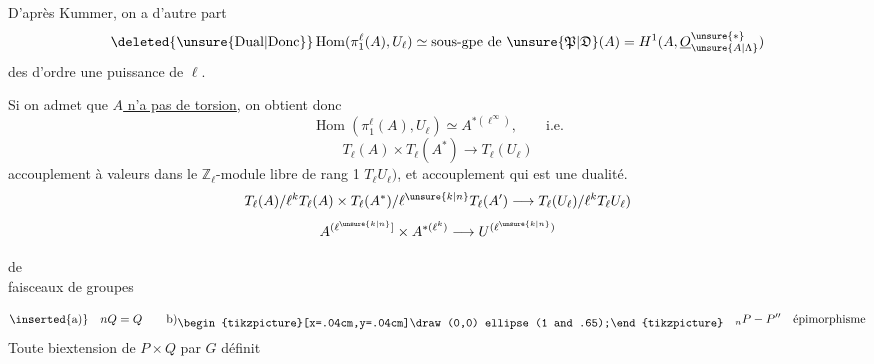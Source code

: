 D'après Kummer, on a d'autre part
\[
\deleted{\text{\unsure{Dual|Donc}}}\operatorname{Hom}(\pi_1^\ell(A),U_\ell)\simeq
\text{sous-gpe de }\unsure{\mathfrak P|\mathfrak D}(A)=H^1(A,\underline O_{\unsure{A|\Lambda}}^{\unsure{*}})
\]
des  d'ordre une puissance de $\ell$.

Si on admet que \uline{$A$ n'a pas de torsion}, on obtient donc
\[
\operatorname{Hom}(\pi_1^\ell(A),U_\ell)\simeq A^{*(\ell^\infty)},\qquad\text{i.e.}
\]
\[\boxed{T_\ell(A)\times T_\ell(A^*)\longrightarrow T_\ell(U_\ell)}\]
accouplement à valeurs dans le $\mathbb Z_\ell$-module libre de rang 1 $T_\ell U_\ell)$, et accouplement qui est une dualité.
\[
T_\ell(A)/\ell^kT_\ell(A)\times T_\ell(A^*)/\ell^{\unsure{k|n}}T_\ell(A')\longrightarrow
T_\ell(U_\ell)/\ell^kT_\ell U_\ell)
\]
\[A^{(\ell^{\unsure{k|n}}]}\times A^{*(\ell^k)}\longrightarrow U^{(\ell^{\unsure{k|n}})}\]

\begin{flushright} de \\faisceaux de groupes\end{flushright}

\[\text{\inserted{a)}}\quad nQ=Q\qquad\text{b)\raisebox{-.7ex}{\begin{tikzpicture}[x=.04cm,y=.04cm]\draw (0,0) ellipse (1 and .65);\end{tikzpicture}}}\quad {}_nP\mathbin{-}P''\quad\text{épimorphisme}\]
Toute biextension  de $P\times Q$  par $G$ définit


